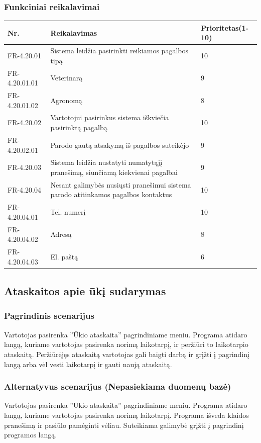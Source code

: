 \documentclass[oneside]{VUMIFPSkursinis}
\begin{document}
	\subsubsection{Funkciniai reikalavimai}
	\begin{table}[htbp]
		\begin{tabularx}{1\textwidth}{ |P{2.5cm}|X|P{3cm }| }  \hline
			Nr. & Reikalavimas & Prioritetas(1-10) \\ \hline
			FR-4.20.01 & Sistema leidžia pasirinkti reikiamos pagalbos tipą & 10 \\ \hline
			FR-4.20.01.01 & Veterinarą & 9 \\ \hline
			FR-4.20.01.02 & Agronomą & 8 \\ \hline
			FR-4.20.02 & Vartotojui pasirinkus sistema iškviečia pasirinktą pagalbą & 10 \\ \hline	
			FR-4.20.02.01 & Parodo gautą atsakymą iš pagalbos suteikėjo & 9 \\ \hline
			FR-4.20.03 & Sistema leidžia nustatyti numatytąjį pranešimą, siunčiamą kiekvienai pagalbai & 9 \\ \hline	
			FR-4.20.04 & Nesant galimybės nusiųsti pranešimui sistema parodo atitinkamos pagalbos kontaktus & 10 \\ \hline	
			FR-4.20.04.01 & Tel. numerį & 10 \\ \hline	
			FR-4.20.04.02 & Adresą & 8 \\ \hline	
			FR-4.20.04.03 & El. paštą & 6 \\ \hline						
		\end{tabularx}
	\end{table}
\subsection{Ataskaitos apie ūkį sudarymas}
	\subsubsection{Pagrindinis scenarijus}
	Vartotojas pasirenka ''Ūkio ataskaita'' pagrindiniame meniu. Programa atidaro langą, kuriame vartotojas pasirenka norimą laikotarpį, ir peržiūri to laikotarpio ataskaitą. Peržiūrėjęs ataskaitą vartotojas gali baigti darbą ir grįžti į pagrindinį langą arba vėl vesti laikotarpį ir gauti naują ataskaitą.
	\subsubsection{Alternatyvus scenarijus (Nepasiekiama duomenų bazė)}
	Vartotojas pasirenka ''Ūkio ataskaita'' pagrindiniame meniu. Programa atidaro langą, kuriame vartotojas pasirenka norimą laikotarpį. Programa išveda klaidos pranešimą ir pasiūlo pamėginti vėliau. Suteikiama galimybė grįžti į pagrindinį programos langą.
\end{document}
